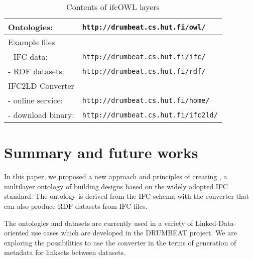 \begin{table}
    \caption{Contents of ifcOWL layers}
    \label{tab:ifc2ld-web}
    \centering
    \scriptsize
    \def\arraystretch{1.2}          %
    \setlength{\tabcolsep}{6pt}     %
    \begin{tabularx}{0.90\textwidth}{|l|X|}
        \hline
        Ontologies: & \texttt{http://drumbeat.cs.hut.fi/owl/} \\
        \hline
        Example files & \\
        - IFC data: & \texttt{http://drumbeat.cs.hut.fi/ifc/} \\
        - RDF datasets: & \texttt{http://drumbeat.cs.hut.fi/rdf/} \\
        \hline
        IFC2LD Converter & \\
        - online service: & \texttt{http://drumbeat.cs.hut.fi/home/} \\
        - download binary: & \texttt{http://drumbeat.cs.hut.fi/ifc2ld/} \\
        \hline
    \end{tabularx}
\end{table}

\section{Summary and future works}
\label{sec:summary}

In this paper, we proposed a new approach and principles of creating \ifcowl{}, a multilayer ontology of building designs based on the widely adopted IFC standard. The ontology is 
derived from the IFC schema with the \ifcld{} converter that can also produce RDF datasets from IFC files. 

The \ifcowl{} ontologies and \ifcrdf{} datasets are currently used in a variety of Linked-Data-oriented use cases \cite{torma2013semantic} which are developed in the DRUMBEAT project. We are exploring the possibilities to use the \ifcld{} converter in the terms of generation of metadata for linksets between \ifcrdf{} datasets.


